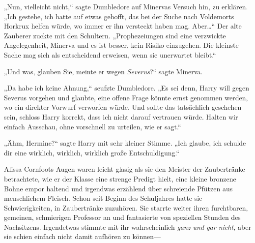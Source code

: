 „Nun, vielleicht nicht,“ sagte Dumbledore auf Minervas Versuch hin, zu erklären. „Ich gestehe, ich hatte auf etwas gehofft, das bei der Suche nach Voldemorts Horkrux helfen würde, wo immer er ihn versteckt haben mag. Aber…“ Der alte Zauberer zuckte mit den Schultern. „Prophezeiungen sind eine verzwickte Angelegenheit, Minerva und es ist besser, kein Risiko einzugehen. Die kleinste Sache mag sich als entscheidend erweisen, wenn sie unerwartet bleibt.“

„Und was, glauben Sie, meinte er wegen \emph{Severus}?“ sagte Minerva.

„Da habe ich keine Ahnung,“ seufzte Dumbledore. „Es sei denn, Harry will gegen Severus vorgehen und glaubte, eine offene Frage könnte ernst genommen werden, wo ein direkter Vorwurf verworfen würde. Und sollte das tatsächlich geschehen sein, schloss Harry korrekt, dass ich nicht darauf vertrauen würde. Halten wir einfach Ausschau, ohne vorschnell zu urteilen, wie er sagt.“


„Ähm, Hermine?“ sagte Harry mit sehr kleiner Stimme. „Ich glaube, ich schulde dir eine wirklich, wirklich, wirklich große Entschuldigung.“


Alissa Cornfoots Augen waren leicht glasig als sie den Meister der Zaubertränke betrachtete, wie er der Klasse eine strenge Predigt hielt, eine kleine bronzene Bohne empor haltend und irgendwas erzählend über schreiende Pfützen aus menschlichem Fleisch. Schon seit Beginn des Schuljahres hatte sie Schwierigkeiten, in Zaubertränke zuzuhören. Sie starrte weiter ihren furchtbaren, gemeinen, schmierigen Professor an und fantasierte von speziellen Stunden des Nachsitzens. Irgendetwas stimmte mit ihr wahrscheinlich \emph{ganz und gar nicht,} aber sie schien einfach nicht damit aufhören zu können—

